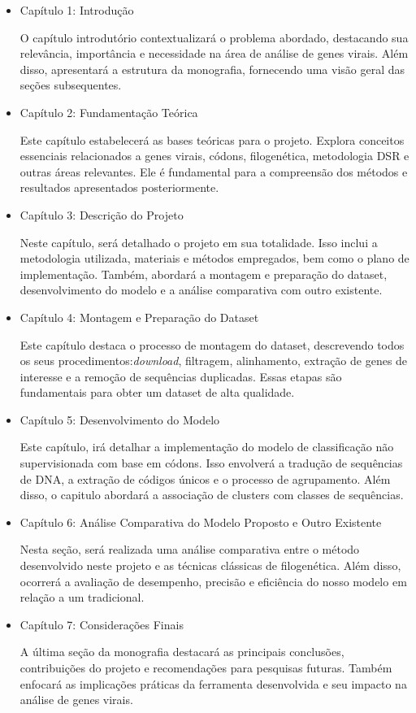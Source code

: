 \begin{itemize}
      \item Capítulo 1: Introdução

            O capítulo introdutório contextualizará o problema abordado, destacando sua relevância, importância e necessidade na área de análise de genes virais. Além disso, apresentará a estrutura da monografia, fornecendo uma visão geral das seções subsequentes.

      \item Capítulo 2: Fundamentação Teórica

            Este capítulo estabelecerá as bases teóricas para o projeto. Explora conceitos essenciais relacionados a genes virais, códons, filogenética, metodologia DSR e outras áreas relevantes. Ele é fundamental para a compreensão dos métodos e resultados apresentados posteriormente.

      \item Capítulo 3: Descrição do Projeto

            Neste capítulo, será detalhado o projeto em sua totalidade. Isso inclui a metodologia utilizada, materiais e métodos empregados, bem como o plano de implementação. Também, abordará a montagem e preparação do dataset, desenvolvimento do modelo e a análise comparativa com outro existente.

      \item Capítulo 4: Montagem e Preparação do Dataset

            Este capítulo destaca o processo de montagem do dataset, descrevendo todos os seus procedimentos:\textit{download}, filtragem, alinhamento, extração de genes de interesse e a remoção de sequências duplicadas. Essas etapas são fundamentais para obter um dataset de alta qualidade.

      \item Capítulo 5: Desenvolvimento do Modelo

            Este capítulo, irá detalhar a implementação do modelo de classificação não supervisionada com base em códons. Isso envolverá a tradução de sequências de DNA, a extração de códigos únicos e o processo de agrupamento. Além disso, o capitulo abordará a associação de clusters com classes de sequências.

      \item Capítulo 6: Análise Comparativa do Modelo Proposto e Outro Existente

            Nesta seção, será realizada uma análise comparativa entre o método desenvolvido neste projeto e as técnicas clássicas de filogenética. Além disso, ocorrerá a avaliação de desempenho, precisão e eficiência do nosso modelo em relação a um tradicional.

      \item Capítulo 7: Considerações Finais

            A última seção da monografia destacará as principais conclusões, contribuições do projeto e recomendações para pesquisas futuras. Também enfocará as implicações práticas da ferramenta desenvolvida e seu impacto na análise de genes virais.
\end{itemize}

